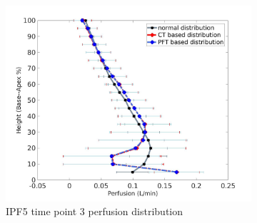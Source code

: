 \begin{figure}[htbp]
\begin{subfigure}{.6\linewidth}
  \includegraphics[width=\linewidth,trim={{.0\wd0} {.0\wd0} {.0\wd0} {.0\wd0}},clip]{Appendix/Image_AppexB/IPF513/IPF513_PerfusionAgainstLungHeight.jpg}
  \caption{IPF5 time point 3 perfusion distribution}
  \label{fig:IPF513VQDistribution-b}
\end{subfigure}
\begin{subfigure}{.6\linewidth}%

\end{subfigure}
\end{figure}
